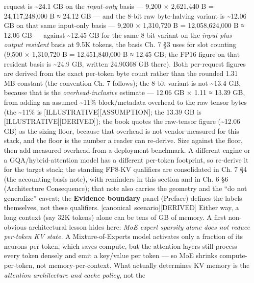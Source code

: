 request is \textasciitilde24.1 GB on the \emph{input-only} basis ---
9,200 × 2,621,440 B = 24,117,248,000 B ≈ 24.12 GB --- and the 8-bit raw
byte-halving variant is \textasciitilde12.06 GB on that same input-only
basis --- 9,200 × 1,310,720 B = 12,058,624,000 B ≈ 12.06 GB --- against
\textasciitilde12.45 GB for the same 8-bit variant on the
\emph{input-plus-output resident} basis at 9.5K tokens, the basis Ch. 7
§3 uses for slot counting (9,500 × 1,310,720 B = 12,451,840,000 B ≈
12.45 GB; the FP16 figure on that resident basis is \textasciitilde24.9
GB, written 24.90368 GB there). Both per-request figures are derived
from the exact per-token byte count rather than the rounded 1.31 MB
constant (the convention Ch. 7 follows); the 8-bit variant is not
\textasciitilde13.4 GB, because that is the \emph{overhead-inclusive}
estimate --- 12.06 GB × 1.11 ≈ 13.39 GB, from adding an assumed
\textasciitilde11\% block/metadata overhead to the raw tensor bytes (the
\textasciitilde11\% is \mbox{{[}ILLUSTRATIVE{]}}\hspace{0pt}\mbox{{[}ASSUMPTION{]}}; the 13.39 GB
is \mbox{{[}ILLUSTRATIVE{]}}\hspace{0pt}\mbox{{[}DERIVED{]}}); the book quotes the raw-tensor
figure (\textasciitilde12.06 GB) as the sizing floor, because that
overhead is not vendor-measured for this stack, and the floor is the
number a reader can re-derive. Size against the floor, then add measured
overhead from a deployment benchmark. A different engine or a
GQA/hybrid-attention model has a different per-token footprint, so
re-derive it for the target stack; the standing FP8-KV qualifiers are
consolidated in Ch. 7 §4 (the accounting-basis note), with reminders in
this section and in Ch. 6 §6 (Architecture Consequence); that note also
carries the geometry and the ``do not generalize'' caveat; the
\textbf{Evidence boundary} panel (Preface) defines the labels
themselves, not these qualifiers. \mbox{{[}canonical scenario{]}}\hspace{0pt}\mbox{{[}DERIVED{]}}
Either way, a long context (say 32K tokens) alone can be tens of GB of
memory. A first non-obvious architectural lesson hides here: \emph{MoE
expert sparsity alone does not reduce per-token KV state.} A
Mixture-of-Experts model activates only a fraction of its neurons per
token, which saves compute, but the attention layers still process every
token densely and emit a key/value per token --- so MoE shrinks
compute-per-token, not memory-per-context. What actually determines KV
memory is the \emph{attention architecture and cache policy}, not the
